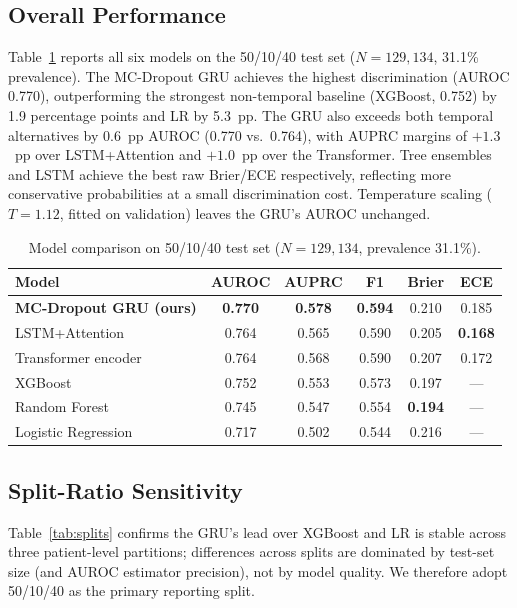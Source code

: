 \documentclass[runningheads]{llncs}
\begin{document}
\subsection{Overall Performance}
Table~\ref{tab:main} reports all six models on the 50/10/40 test set ($N=129{,}134$, 31.1\% prevalence). The MC-Dropout GRU achieves the highest discrimination (AUROC 0.770), outperforming the strongest non-temporal baseline (XGBoost, 0.752) by 1.9 percentage points and LR by 5.3~pp. The GRU also exceeds both temporal alternatives by 0.6~pp AUROC (0.770 vs.\ 0.764), with AUPRC margins of $+1.3$~pp over LSTM+Attention and $+1.0$~pp over the Transformer. Tree ensembles and LSTM achieve the best raw Brier/ECE respectively, reflecting more conservative probabilities at a small discrimination cost. Temperature scaling ($T=1.12$, fitted on validation) leaves the GRU's AUROC unchanged.

\begin{table}[t]
\caption{Model comparison on 50/10/40 test set ($N=129{,}134$, prevalence 31.1\%).}
\label{tab:main}
\centering\small
\begin{tabular}{lccccc}
\toprule
\textbf{Model} & \textbf{AUROC} & \textbf{AUPRC} & \textbf{F1} & \textbf{Brier} & \textbf{ECE} \\
\midrule
\textbf{MC-Dropout GRU (ours)} & \textbf{0.770} & \textbf{0.578} & \textbf{0.594} & 0.210 & 0.185 \\
LSTM+Attention                 & 0.764 & 0.565 & 0.590 & 0.205 & \textbf{0.168} \\
Transformer encoder            & 0.764 & 0.568 & 0.590 & 0.207 & 0.172 \\
\midrule
XGBoost                        & 0.752 & 0.553 & 0.573 & 0.197 & --- \\
Random Forest                  & 0.745 & 0.547 & 0.554 & \textbf{0.194} & --- \\
Logistic Regression            & 0.717 & 0.502 & 0.544 & 0.216 & --- \\
\bottomrule
\end{tabular}
\end{table}

\subsection{Split-Ratio Sensitivity}
Table~\ref{tab:splits} confirms the GRU's lead over XGBoost and LR is stable across three patient-level partitions; differences across splits are dominated by test-set size (and AUROC estimator precision), not by model quality. We therefore adopt 50/10/40 as the primary reporting split.
\end{document}
